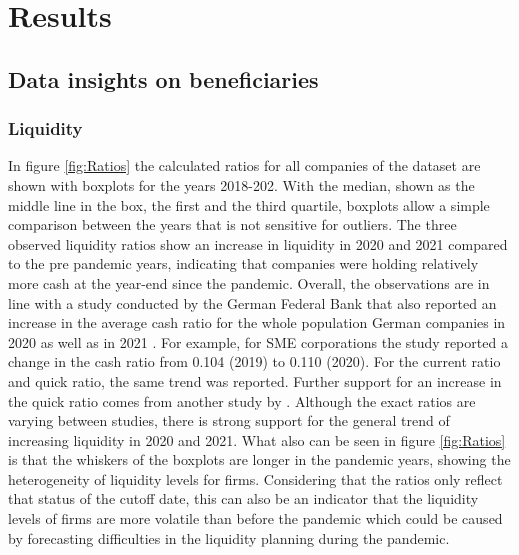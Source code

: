 
\chapter{Results} %

\label{Chapter5} %


\section{Data insights on beneficiaries}
\label{BSratio}

\subsection{Liquidity}

In figure \ref{fig:Ratios} the calculated ratios for all companies of the dataset are shown with boxplots for the years 2018-202. With the median, shown as the middle line in the box, the first and the third quartile, boxplots allow a simple comparison between the years that is not sensitive for outliers. The three observed liquidity ratios show an increase in liquidity in 2020 and 2021 compared to the pre pandemic years, indicating that companies were holding relatively more cash at the year-end since the pandemic. 
Overall, the observations are in line with a study conducted by the German Federal Bank that also reported an increase in the average cash ratio for the whole population German companies in 2020 as well as in 2021 \parencite{deutsche_bundesbank_jahresabschlussstatistik_2022}. For example, for SME corporations the study reported a change in the cash ratio from 0.104 (2019) to 0.110 (2020). For the current ratio and quick ratio, the same trend was reported. Further support for an increase in the quick ratio comes from another study by \parencite{bley_mittelstand_2022}. Although the exact ratios are varying between studies, there is strong support for the general trend of increasing liquidity in 2020 and 2021.
What also can be seen in figure \ref{fig:Ratios} is that the whiskers of the boxplots are longer in the pandemic years, showing the heterogeneity of liquidity levels for firms. Considering that the ratios only reflect that status of the cutoff date, this can also be an indicator that the liquidity levels of firms are more volatile than before the pandemic which could be caused by forecasting difficulties in the liquidity planning during the pandemic. 


